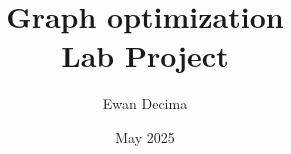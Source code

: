 \documentclass[10pt]{article}
\begin{document}
	\title{Graph optimization \\ Lab Project}
	\author{Ewan Decima}
	\date{May 2025}

	\maketitle

	\tableofcontents
	\newpage

	
	\newpage

	
	\newpage

	
	\newpage

	
	\newpage

	
	\newpage

	
	\newpage
\end{document}
